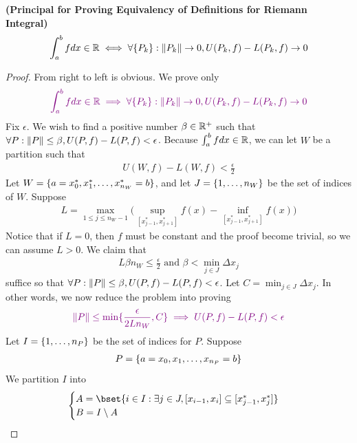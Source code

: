 \documentclass{report}
\begin{document}
\begin{theorem}
\label{1}
\textbf{(Principal for Proving Equivalency of Definitions for Riemann Integral)} 
\begin{align*}
\int_a^b fdx\in\mathbb{R} \iff  \forall \{ P_k \} : \| P_k \|\to 0, U(P_k,f)-L(P_k,f)\to 0
\end{align*}
\end{theorem}
\begin{proof}
From right to left is obvious. We prove only 
\begin{align*}
  \textcolor{violet}{\int_a^b fdx\in\mathbb{R} \implies   \forall \{ P_k \} : \| P_k \|\to 0, U(P_k,f)-L(P_k,f)\to 0}
\end{align*}
Fix $\epsilon $. We wish to find a positive number $\beta \in\mathbb{R}^+$ such that $\forall P: \| P \|\leq \beta , U(P,f)-L(P,f)<\epsilon $. Because $\int_a^b fdx \in\mathbb{R}$, we can let $W$ be a partition such that 
\begin{align*}
U(W,f)-L(W,f)<\frac{\epsilon}{2}
\end{align*}
Let $W=\{ a=x_0^*,x_1^*,\dots ,x_{n_W}^*=b \}$, and let $J=\{ 1,\dots ,n_W \}$ be the set of indices of $W$. Suppose
\begin{align}
\label{e1}
L= \max_{1\leq j\leq n_W-1} \big(\sup_{[x_{j-1}^*,x_{j+1}^*]} f(x)- \inf_{[x_{j-1}^*,x_{j+1}^*]} f(x) \big)
\end{align}
Notice that if $L=0$, then  $f$ must be constant and the proof become trivial, so we can assume $L>0$. We claim that 
\begin{align*}
L\beta n_W\leq \frac{\epsilon}{2}\text{ and }\beta < \min_{j \in J}\Delta x_j
\end{align*}
suffice so that $\forall P:\| P \|\leq \beta , U(P,f)-L(P,f)<\epsilon $. Let $C= \min_{j \in J}\Delta x_j$. In other words, we now reduce the problem into proving 
\begin{align*}
  \textcolor{violet}{ \| P \| \leq \min \{ \frac{\epsilon }{2Ln_W },C \} \implies U(P,f)-L(P,f)<\epsilon }
\end{align*}
Let $I=\{ 1,\dots , n_P \}$ be the set of indices for $P$. Suppose 
\begin{align*}
P=\{ a=x_0,x_1,\dots ,x_{n_P}=b \}
\end{align*}
We partition $I$ into 
\begin{align*}
\begin{cases}
  A=\bset{i \in I : \exists j \in J,  [x_{i-1},x_i]\subseteq [x_{j-1}^*,x_j^*]}\\
  B=I \setminus  A 
\end{cases}
\end{align*}

\end{proof}
\end{document}
